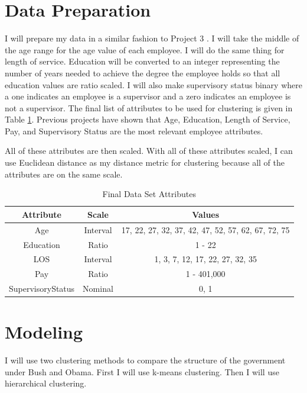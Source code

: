 \documentclass{article}
\begin{document}
\section{Data Preparation}
I will prepare my data in a similar fashion to Project 3 \cite{proj3}. I will take the middle of the age range for the age value of each employee. I will do the same thing for length of service. Education will be converted to an integer representing the number of years needed to achieve the degree the employee holds so that all education values are ratio scaled. I will also make supervisory status binary where a one indicates an employee is a supervisor and a zero indicates an employee is not a supervisor. The final list of attributes to be used for clustering is given in Table \ref{tab:1}. Previous projects have shown that Age, Education, Length of Service, Pay, and Supervisory Status are the most relevant employee attributes.
\par
All of these attributes are then scaled. With all of these attributes scaled, I can use Euclidean distance as my distance metric for clustering because all of the attributes are on the same scale.

    \begin{center}
        \begin{table}
            \centering
            \begin{tabular}{ |c|c|c| }
                \hline
                Attribute & Scale & Values \\
                \hline
                Age & Interval & 17, 22, 27, 32, 37, 42, 47, 52, 57, 62, 67, 72, 75 \\
                Education & Ratio & 1 - 22 \\
                LOS & Interval & 1, 3, 7, 12, 17, 22, 27, 32, 35 \\
                Pay & Ratio & 1 - 401,000 \\
                SupervisoryStatus & Nominal & 0, 1 \\
                \hline
            \end{tabular}
            \caption{Final Data Set Attributes}
            \label{tab:1}
        \end{table}
    \end{center}

\section{Modeling}
I will use two clustering methods to compare the structure of the government under Bush and Obama. First I will use k-means clustering. Then I will use hierarchical clustering.
\end{document}
